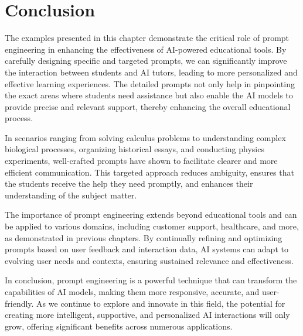\section{Conclusion}
The examples presented in this chapter demonstrate the critical role of prompt engineering in enhancing the effectiveness of AI-powered educational tools. By carefully designing specific and targeted prompts, we can significantly improve the interaction between students and AI tutors, leading to more personalized and effective learning experiences. The detailed prompts not only help in pinpointing the exact areas where students need assistance but also enable the AI models to provide precise and relevant support, thereby enhancing the overall educational process.

In scenarios ranging from solving calculus problems to understanding complex biological processes, organizing historical essays, and conducting physics experiments, well-crafted prompts have shown to facilitate clearer and more efficient communication. This targeted approach reduces ambiguity, ensures that the students receive the help they need promptly, and enhances their understanding of the subject matter.

The importance of prompt engineering extends beyond educational tools and can be applied to various domains, including customer support, healthcare, and more, as demonstrated in previous chapters. By continually refining and optimizing prompts based on user feedback and interaction data, AI systems can adapt to evolving user needs and contexts, ensuring sustained relevance and effectiveness.

In conclusion, prompt engineering is a powerful technique that can transform the capabilities of AI models, making them more responsive, accurate, and user-friendly. As we continue to explore and innovate in this field, the potential for creating more intelligent, supportive, and personalized AI interactions will only grow, offering significant benefits across numerous applications.

